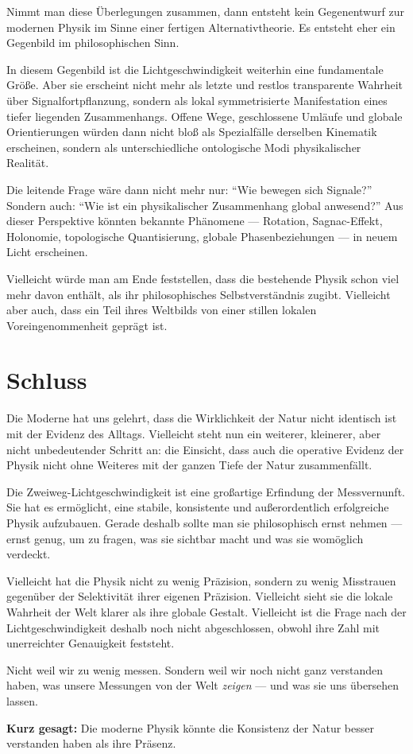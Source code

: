 \documentclass[11pt,a4paper]{article}
\theoremstyle{remark}
\begin{document}
	Nimmt man diese Überlegungen zusammen, dann entsteht kein Gegenentwurf zur modernen Physik im Sinne einer fertigen Alternativtheorie. Es entsteht eher ein Gegenbild im philosophischen Sinn.
	
	In diesem Gegenbild ist die Lichtgeschwindigkeit weiterhin eine fundamentale Größe. Aber sie erscheint nicht mehr als letzte und restlos transparente Wahrheit über Signalfortpflanzung, sondern als lokal symmetrisierte Manifestation eines tiefer liegenden Zusammenhangs. Offene Wege, geschlossene Umläufe und globale Orientierungen würden dann nicht bloß als Spezialfälle derselben Kinematik erscheinen, sondern als unterschiedliche ontologische Modi physikalischer Realität.
	
	Die leitende Frage wäre dann nicht mehr nur: ``Wie bewegen sich Signale?'' Sondern auch: ``Wie ist ein physikalischer Zusammenhang global anwesend?'' Aus dieser Perspektive könnten bekannte Phänomene --- Rotation, Sagnac-Effekt, Holonomie, topologische Quantisierung, globale Phasenbeziehungen --- in neuem Licht erscheinen.
	
	Vielleicht würde man am Ende feststellen, dass die bestehende Physik schon viel mehr davon enthält, als ihr philosophisches Selbstverständnis zugibt. Vielleicht aber auch, dass ein Teil ihres Weltbilds von einer stillen lokalen Voreingenommenheit geprägt ist.
	
	\section*{Schluss}
	
	Die Moderne hat uns gelehrt, dass die Wirklichkeit der Natur nicht identisch ist mit der Evidenz des Alltags. Vielleicht steht nun ein weiterer, kleinerer, aber nicht unbedeutender Schritt an: die Einsicht, dass auch die operative Evidenz der Physik nicht ohne Weiteres mit der ganzen Tiefe der Natur zusammenfällt.
	
	Die Zweiweg-Lichtgeschwindigkeit ist eine großartige Erfindung der Messvernunft. Sie hat es ermöglicht, eine stabile, konsistente und außerordentlich erfolgreiche Physik aufzubauen. Gerade deshalb sollte man sie philosophisch ernst nehmen --- ernst genug, um zu fragen, was sie sichtbar macht und was sie womöglich verdeckt.
	
	Vielleicht hat die Physik nicht zu wenig Präzision, sondern zu wenig Misstrauen gegenüber der Selektivität ihrer eigenen Präzision. Vielleicht sieht sie die lokale Wahrheit der Welt klarer als ihre globale Gestalt. Vielleicht ist die Frage nach der Lichtgeschwindigkeit deshalb noch nicht abgeschlossen, obwohl ihre Zahl mit unerreichter Genauigkeit feststeht.
	
	Nicht weil wir zu wenig messen. Sondern weil wir noch nicht ganz verstanden haben, was unsere Messungen von der Welt \emph{zeigen} --- und was sie uns übersehen lassen.
	
	\vspace{1.5em}
	\noindent\textbf{Kurz gesagt:} Die moderne Physik könnte die Konsistenz der Natur besser verstanden haben als ihre Präsenz.
	
\end{document}
